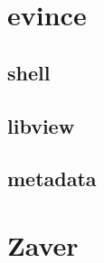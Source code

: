 \documentclass[12pt,oneside,final]{fithesis2}
\begin{document}
\chapter{evince}
\section{shell}
\section{libview}
\section{metadata}
\chapter{Zaver}
\end{document}
